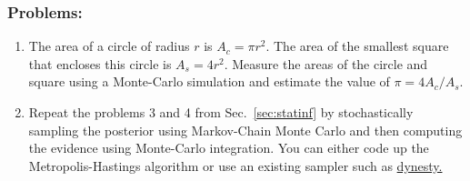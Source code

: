 \subsubsection{Problems:}
\begin{enumerate}
\item The area of a circle of radius $r$ is $A_c = \pi r^2$. The area of the smallest square that encloses this circle is $A_s = 4 r^2$. Measure the areas of the circle and square using a Monte-Carlo simulation and estimate the value of $\pi = 4 A_c/A_s$. 
\item Repeat the problems 3 and 4 from Sec.~\ref{sec:statinf} by stochastically sampling the posterior using Markov-Chain Monte Carlo and then computing the evidence using Monte-Carlo integration. You can either code up the Metropolis-Hastings algorithm or use an existing sampler such as \href{https://dynesty.readthedocs.io/en/stable/}{dynesty.} 
\end{enumerate}